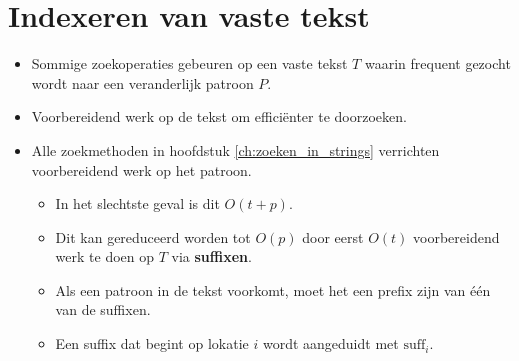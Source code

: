 \newcommand{\suffix}[1]{$\text{suff}_{#1}$}

\chapter{Indexeren van vaste tekst}
\begin{itemize}
    \item Sommige zoekoperaties gebeuren op een vaste tekst $T$ waarin frequent gezocht wordt naar een veranderlijk patroon $P$.
    \item Voorbereidend werk op de tekst om efficiënter te doorzoeken.
    \item Alle zoekmethoden in hoofdstuk \ref{ch:zoeken_in_strings} verrichten voorbereidend werk op het patroon.
    \begin{itemize}
        \item In het slechtste geval is dit $O(t + p)$.
        \item Dit kan gereduceerd worden tot $O(p)$ door eerst $O(t)$ voorbereidend werk te doen op $T$ via \textbf{suffixen}.
        \item Als een patroon in de tekst voorkomt, moet het een prefix zijn van één van de suffixen.
        \item Een suffix dat begint op lokatie $i$ wordt aangeduidt met \suffix{i}.
    \end{itemize}
\end{itemize}



